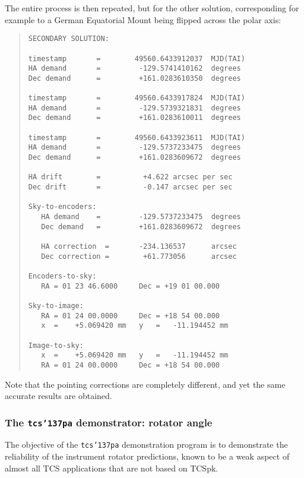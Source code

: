 \documentclass[12pt,fleqn,twoside]{article}
\renewcommand{\_}{{\tt\char'137}}     %
\begin{document}
The entire process is then repeated, but for the other
solution, corresponding for example to a German Equatorial Mount
being flipped across the polar axis:
\begin{quote}
\begin{small}
\begin{verbatim}
SECONDARY SOLUTION:

timestamp       =        49560.6433912037  MJD(TAI)
HA demand       =         -129.5741410162  degrees
Dec demand      =         +161.0283610350  degrees

timestamp       =        49560.6433917824  MJD(TAI)
HA demand       =         -129.5739321831  degrees
Dec demand      =         +161.0283610011  degrees

timestamp       =        49560.6433923611  MJD(TAI)
HA demand       =         -129.5737233475  degrees
Dec demand      =         +161.0283609672  degrees

HA drift        =          +4.622 arcsec per sec
Dec drift       =          -0.147 arcsec per sec

Sky-to-encoders:
   HA demand    =         -129.5737233475  degrees
   Dec demand   =         +161.0283609672  degrees

   HA correction  =       -234.136537      arcsec
   Dec correction =        +61.773056      arcsec

Encoders-to-sky:
   RA = 01 23 46.6000     Dec = +19 01 00.000

Sky-to-image:
   RA = 01 24 00.0000     Dec = +18 54 00.000
   x  =    +5.069420 mm   y   =   -11.194452 mm

Image-to-sky:
   x  =    +5.069420 mm   y   =   -11.194452 mm
   RA = 01 24 00.0000     Dec = +18 54 00.000
\end{verbatim}\end{small}
\end{quote}
Note that the pointing corrections are completely different,
and yet the same accurate results are obtained.


\newpage
\subsubsection{The {\tt tcs\_pa} demonstrator: rotator angle}
\label{tcs_pa}

The objective of the {\tt tcs\_pa} demonstration program
is to demonstrate the reliability of the
instrument rotator predictions, known to be a weak aspect of almost
all TCS applications that are not based on TCSpk.
\end{document}

